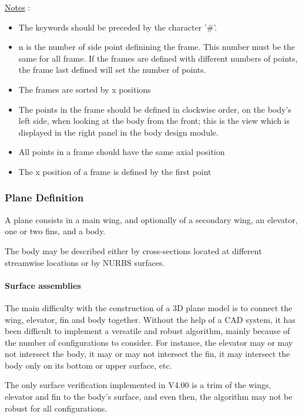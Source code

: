 \documentclass[a4paper,twoside,12pt,dvips]{article}
\begin{document}
\underline{Notes} :

\begin{itemize}
\item The keywords should be preceded by the character '\#'.
\item n is the number of side point definining the frame. This number
must be the same for all frame. If the frames are defined with
different numbers of points, the frame last defined will set the
number of points.
\item The frames are sorted by x positions
\item The points in the frame should be defined in clockwise order, on
the body's left side, when looking at the body from the front; this is
the view which is displayed in the right panel in the body design
module.
\item All points in a frame should have the same axial position
\item The x position of a frame is defined by the first point
\end{itemize}

\subsubsection{Plane Definition}

A plane consists in a main wing, and optionally of a secondary wing,
an elevator, one or two fins, and a body.

The body may be described either by cross-sections located at
different streamwise locations or by NURBS surfaces.

\paragraph[Surface assemblies]{Surface assemblies}

The main difficulty with the construction of a 3D plane model is to
connect the wing, elevator, fin and body together. Without the help of
a CAD system, it has been difficult to implement a versatile and
robust algorithm, mainly because of the number of configurations to
consider.  For instance, the elevator may or may not intersect the
body, it may or may not intersect the fin, it may intersect the body
only on its bottom or upper surface, etc.

The only surface verification implemented in V4.00 is a trim of the
wings, elevator and fin to the body's surface, and even then, the
algorithm may not be robust for all configurations.
\end{document}
